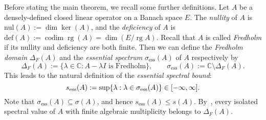 \documentclass[a4paper, reqno]{amsart}
\numberwithin{equation}{section}
\theoremstyle{plain}
\theoremstyle{definition}
\theoremstyle{remark}
\DeclareMathOperator{\rg}{rg}
\DeclareMathOperator{\codim}{codim}
\let\Re\relax
\DeclareMathOperator{\Re}{Re}
\newcommand{\CC}{\mathbb{C}}
\begin{document}
Before stating the main theorem, we recall some further definitions. Let $A$ be a densely-defined closed linear operator on a Banach space $E$. The \emph{nullity} of $A$ is $\mathrm{nul}(A):=\dim\ker(A)$, and the \emph{deficiency} of $A$ is $\mathrm{def}(A):=\codim\rg(A)=\dim(E/\rg A)$. Recall that $A$ is called \emph{Fredholm} if its nullity and deficiency are both finite. Then we can define the \emph{Fredholm domain} $\Delta_F(A)$ and the \emph{essential spectrum} $\sigma_{\mathrm{ess}}(A)$ of $A$ respectively by
\begin{equation}
	\Delta_F(A):=\{\lambda\in\CC: A-\lambda I \text{ is Fredholm}\}, \qquad \sigma_{\mathrm{ess}}(A):= \CC\setminus\Delta_F(A).
\end{equation}
This leads to the natural definition of the \emph{essential spectral bound}:
\begin{equation}
	s_{\mathrm{ess}}(A):=\sup\{\Re\lambda:\lambda\in\sigma_{\mathrm{ess}}(A)\} \in [-\infty,\infty].
\end{equation}
Note that $\sigma_{\mathrm{ess}}(A)\subseteq\sigma(A)$, and hence $s_{\mathrm{ess}}(A)\le s(A)$. By~\cite[Theorem IV.5.28]{Kato}, every isolated spectral value of $A$ with finite algebraic multiplicity belongs to $\Delta_F(A)$.
\end{document}

